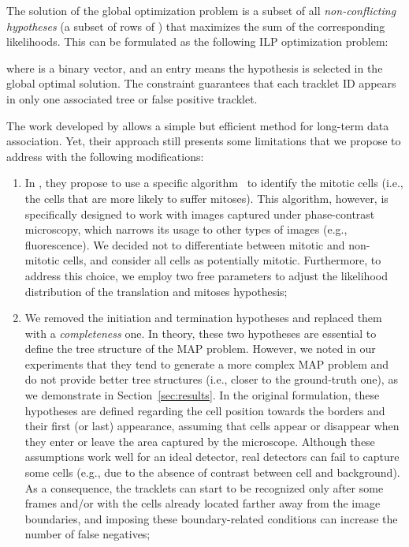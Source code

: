 \documentclass{article}
\begin{document}
The solution of the global optimization problem is a subset of all \textit{non-conflicting hypotheses} (a subset of rows of ) that maximizes the sum of the corresponding likelihoods. This can be formulated as the following ILP optimization problem:

where  is a binary vector, and an entry  means the  hypothesis is selected in the global optimal solution. The constraint  guarantees that each tracklet ID appears in only one associated tree or false positive tracklet.

The work developed by \cite{bise} allows a simple but efficient method for long-term data association. Yet, their approach still presents some limitations that we propose to address with the following modifications:
\begin{enumerate}
    \item In \cite{bise}, they propose to use a specific algorithm~\cite{huh2010automated} to identify the mitotic cells (i.e., the cells that are more likely to suffer mitoses). This algorithm, however, is specifically designed to work with images captured under phase-contrast microscopy, which narrows its usage to other types of images (e.g., fluorescence). We decided not to differentiate between mitotic and non-mitotic cells, and consider all cells as potentially mitotic. Furthermore, to address this choice, we employ two free parameters to adjust the likelihood distribution of the translation and mitoses hypothesis;
    \item We removed the initiation and termination hypotheses and replaced them with a \emph{completeness} one. In theory, these two hypotheses are essential to define the tree structure of the MAP problem. However, we noted in our experiments that they tend to generate a more complex MAP problem and do not provide better tree structures (i.e., closer to the ground-truth one), as we demonstrate in Section~\ref{sec:results}. In the original formulation, these hypotheses are defined regarding the cell position towards the borders and their first (or last) appearance, assuming that cells appear or disappear when they enter or leave the area captured by the microscope. Although these assumptions work well for an ideal detector, real detectors can fail to capture some cells (e.g., due to the absence of contrast between cell and background). As a consequence,  the tracklets can start to be recognized only after some frames and/or with the cells already located farther away from the image boundaries, and imposing these boundary-related conditions can increase the number of false negatives;

\end{enumerate}
\end{document}
